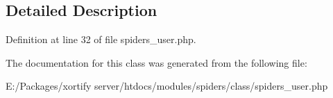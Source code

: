 \subsection{Detailed Description}


Definition at line 32 of file spiders\-\_\-user.\-php.



The documentation for this class was generated from the following file\-:\begin{DoxyCompactItemize}
\item 
E\-:/\-Packages/xortify server/htdocs/modules/spiders/class/spiders\-\_\-user.\-php\end{DoxyCompactItemize}
